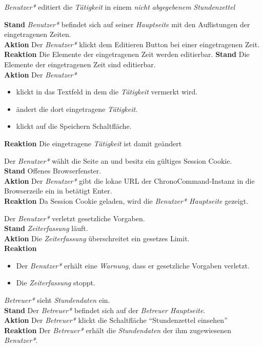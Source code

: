 \begin{requirements}
	 \emph{Benutzer*} editiert die \emph{Tätigkeit} in einem \emph{nicht abgegebenem} \emph{Stundenzettel}
	\begin{requirements}
	        \textbf{Stand} \emph{Benutzer*} befindet sich auf seiner \emph{Hauptseite} mit den Auflistungen der eingetragenen Zeiten. \\
	        \textbf{Aktion} Der \emph{Benutzer*} klickt dem Editieren Button bei einer eingetragenen Zeit.\\
            \textbf{Reaktion} Die Elemente der eingetragenen Zeit werden editierbar.
        \textbf{Stand} Die Elemente der eingetragenen Zeit sind editierbar. \\
        \textbf{Aktion} Der \emph{Benutzer*}
            \begin{itemize}
                \item klickt in das Textfeld in dem die \emph{Tätigkeit} vermerkt wird.
                \item ändert die dort eingetragene \emph{Tätigkeit}.
                \item klickt auf die Speichern Schaltfläche.
            \end{itemize}
            \textbf{Reaktion} Die eingetragene \emph{Tätigkeit} ist damit geändert
    \end{requirements}

     Der \emph{Benutzer*} wählt die Seite an und besitz ein gültiges Session Cookie. \\
        \textbf{Stand} Offenes Browserfenster. \\
        \textbf{Aktion} Der \emph{Benutzer*} gibt die lokae URL der ChronoCommand-Instanz in die Browserzeile ein in betätigt Enter. \\
        \textbf{Reaktion} Da Session Cookie geladen, wird die \emph{Benutzer* Hauptseite} gezeigt.

     Der \emph{Benutzer*} verletzt gesetzliche Vorgaben. \\
        \textbf{Stand} \emph{Zeiterfassung} läuft. \\
        \textbf{Aktion} Die \emph{Zeiterfassung} überschreitet ein gesetzes Limit. \\
        \textbf{Reaktion}
            \begin{itemize}
                \item Der \emph{Benutzer*} erhält eine \emph{Warnung}, dass er gesetzliche Vorgaben verletzt.
                \item Die \emph{Zeiterfassung} stoppt.
            \end{itemize}

     \emph{Betreuer*} sieht \emph{Stundendaten} ein. \\
        \textbf{Stand} Der \emph{Betreuer*} befindet sich auf der \emph{Betreuer Hauptseite}. \\
        \textbf{Aktion} Der \emph{Betreuer*} klickt die Schaltfläche "`Stundenzettel einsehen"' \\
        \textbf{Reaktion} Der \emph{Betreuer*} erhält die \emph{Stundendaten} der ihm zugewiesenen \emph{Benutzer*}.

\end{requirements}
